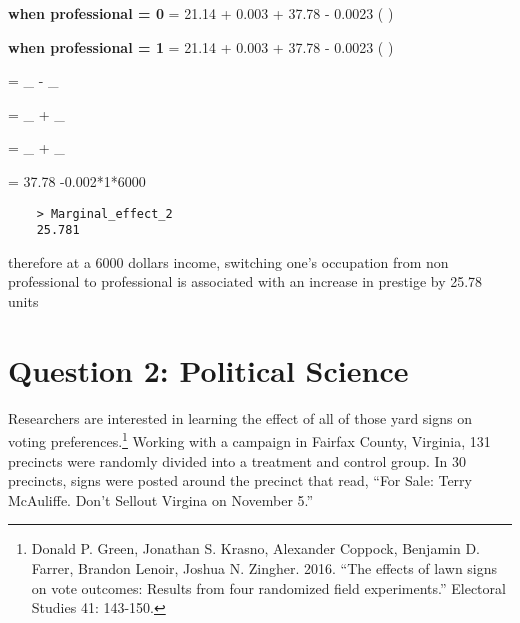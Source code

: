 \documentclass[12pt,letterpaper]{article}
\begin{document}
\begin{enumerate}
	\newline
	\vspace{0.2cm}
	\textbf{when professional = 0}
	\newline 
	 = 21.14 + 0.003 \times {} + 37.78  - 0.0023 \times ( )
	
	\newline
	\vspace{0.2cm}
	\textbf{when professional = 1}
	\newline
	 = 21.14 + 0.003 \times {} + 37.78 - 0.0023 \times ( )
	\newline
	
	\Delta {} = _{} - _{}
	
	\Delta {} = \beta_{} + \beta_{} \cdot {}
	
	\Delta {} = \beta_{} + \beta_{} 
	
	\Delta {} = 37.78 -0.002*1*6000 
	\]
	
	
	\begin{BVerbatim}
	> Marginal_effect_2  
	25.781 
	\end{BVerbatim}
	\vspace{0.3cm}
	
	therefore at a 6000 dollars income, switching one's occupation from non professional to professional is associated with an increase in prestige by 25.78 units
\end{enumerate}

\newpage

\section*{Question 2: Political Science}
\vspace{.25cm}
\noindent 	Researchers are interested in learning the effect of all of those yard signs on voting preferences.\footnote{Donald P. Green, Jonathan	S. Krasno, Alexander Coppock, Benjamin D. Farrer,	Brandon Lenoir, Joshua N. Zingher. 2016. ``The effects of lawn signs on vote outcomes: Results from four randomized field experiments.'' Electoral Studies 41: 143-150. } Working with a campaign in Fairfax County, Virginia, 131 precincts were randomly divided into a treatment and control group. In 30 precincts, signs were posted around the precinct that read, ``For Sale: Terry McAuliffe. Don't Sellout Virgina on November 5.'' \\
\end{document}
